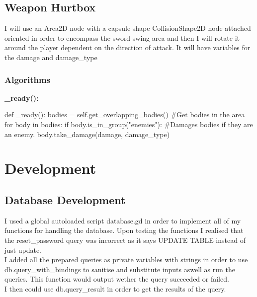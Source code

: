 \documentclass{article}
\begin{document}
        \subsection{Weapon Hurtbox}
        I will use an Area2D node with a capsule shape CollisionShape2D node attached oriented in order to encompass the sword swing area and then I will rotate it around the player dependent on the direction of attack. It will have variables for the damage and damage\_type\\
        \subsubsection{Algorithms}
        \textbf{\_ready():}
        \begin{python}
def _ready():
   bodies = self.get_overlapping_bodies() #Get bodies in the area
   for body in bodies:
      if body.is_in_group("enemies"): #Damages bodies if they are an enemy.
         body.take_damage(damage, damage_type)
        \end{python}
\section{Development}
        \subsection{Database Development}
        I used a global autoloaded script database.gd in order to implement all of my functions for handling the database. Upon testing the functions I realised that the reset\_password query was incorrect as it says UPDATE TABLE instead of just update.\\
        I added all the prepared queries as private variables with strings in order to use db.query\_with\_bindings to sanitise and substitute inputs aswell as run the queries. This function would output wether the query succeeded or failed.\\
        I then could use db.query\_result in order to get the results of the query.\\
\end{document}
